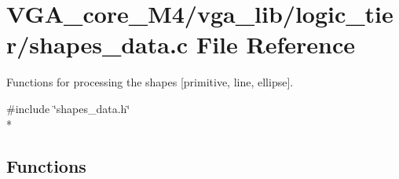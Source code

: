 \section{V\+G\+A\+\_\+core\+\_\+\+M4/vga\+\_\+lib/logic\+\_\+tier/shapes\+\_\+data.c File Reference}
\label{shapes__data_8c}


Functions for processing the shapes [primitive, line, ellipse].  


{\ttfamily \#include \char`\"{}shapes\+\_\+data.\+h\char`\"{}}\\*
\subsection*{Functions}
